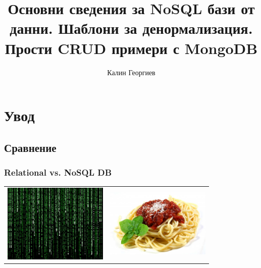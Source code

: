 \documentclass{beamer}
\begin{document}
\title[MongoDB]{Основни сведения за NoSQL бази от данни. Шаблони за денормализация. Прости CRUD примери с MongoDB}
\author{Калин Георгиев}
\frame{\titlepage}

\section{Увод}
\subsection{Сравнение}


\begin{frame}[fragile]
\frametitle{Relational  vs. NoSQL DB}

\begin{center}

\begin{tabular}{ c | c }

\includegraphics[width=5cm]{images/the_matrix}

&

\includegraphics[width=5cm]{images/spaghetti}

\end{tabular}

\end{center}


\end{frame}
\end{document}
